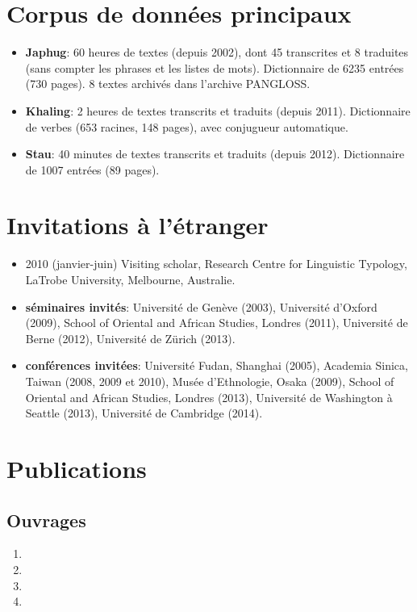\documentclass[oldfontcommands,oneside,a4paper,11pt]{article}
\begin{document}
\section*{Corpus de données principaux}
\begin{itemize}
\item \textbf{Japhug}: 60 heures de textes (depuis 2002), dont 45 transcrites et 8 traduites (sans compter les phrases et les listes de mots). Dictionnaire de 6235 entrées (730 pages). 8 textes archivés dans l'archive PANGLOSS.
\item \textbf{Khaling}: 2 heures de textes transcrits et traduits (depuis 2011). Dictionnaire de verbes (653 racines, 148 pages), avec conjugueur automatique.
\item \textbf{Stau}: 40 minutes de textes transcrits et traduits (depuis 2012). Dictionnaire de 1007 entrées (89 pages).
  \end{itemize}
  
 
  
\section*{Invitations à l'étranger}
\begin{itemize}
\item   2010 (janvier-juin) Visiting scholar, Research Centre for Linguistic Typology, LaTrobe University, Melbourne, Australie.
 \item   \textbf{séminaires invités}:  Université de Genève (2003),  Université d'Oxford (2009), School of Oriental and African Studies, Londres (2011), Université de Berne (2012),  Université de Zürich (2013).
 \item \textbf{conférences invitées}: Université Fudan, Shanghai (2005), Academia Sinica, Taiwan (2008, 2009 et 2010), Musée d'Ethnologie, Osaka (2009), School of Oriental and African Studies, Londres (2013), Université de Washington à Seattle (2013),  Université de Cambridge (2014).
  \end{itemize}
    
\section*{Publications}
  \subsection*{Ouvrages}
  \begin{enumerate}

 \item  {}
\item {}
   \item {}
  \item  {}
     
\end{enumerate}
\end{document}
